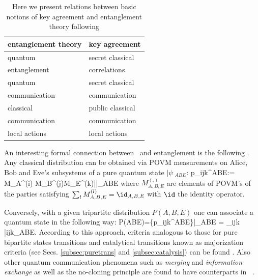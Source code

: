 \documentclass[rmp,12pt,preprint]{revtex4-2}
\begin{document}
\begin{table}
    \centering
    \begin{tabular}{l @{\hskip2mm} | @{\hskip2mm} l}
      \bf entanglement theory & \bf key agreement \\[2mm]
      \hline
      quantum &secret classical \\
      entanglement & correlations\\[2mm]
      quantum & secret classical \\
      communication & communication\\[2mm]
      classical & public classical \\
      communication & communication\\[2mm]
      local actions & local actions\\
        \end{tabular}
        \caption{Here we present relations between basic notions
        of key agreement and entanglement theory following \cite{Collins-Popescu}}
\end{table}

An interesting formal connection between \cka\ and entanglement is
the following \cite{GisinWolf_linking}.
Any classical distribution can be obtained via POVM
measurements on Alice, Bob and Eve's subsystems of a pure quantum
state $|\psi\>_{ABE}$: \be p_{ijk}^{ABE}:={\tr} M_A^{(i)}\ot
M_B^{(j)}\ot M_E^{(k)}|\psi\>\<\psi|_{ABE}
\label{eq:GWprocedure}\ee where
$M_{A,B,E}^{(.)}$ are elements of POVM's of the parties satisfying
$\sum_{l}M_{A,B,E}^{(l)}=\id_{A,B,E}$ with $\id$ the identity operator.

Conversely, with a given tripartite distribution $P(A,B,E)$ one can
associate a quantum state in the following way: \be
P(ABE)=\{{p_{ijk}^{ABE}}\}\longmapsto |\psi_{ABE}\> = \sum_{ijk}
|ijk\>_{ABE}. \ee According to this approach,
criteria analogous to those for pure bipartite states transitions
and catalytical transitions known as majorization criteria (see Secs. \ref{subsec:puretrans} and \ref{subsec:catalysis}) can
be found \cite{GisinWolf_linking,Collins-Popescu}. Also
other quantum communication phenomena such as {\it merging}
\cite{SW-nature} and {\it information exchange} \cite{uncom_info} as
well as the no-cloning principle are found to have counterparts in
\cka\ \cite{OppenSpekWint05}.
\end{document}
